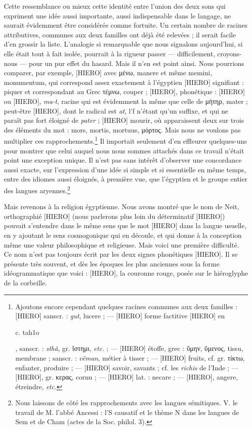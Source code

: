 \documentclass[a4paper, 11pt, oneside]{article}
\begin{document}
Cette ressemblance ou mieux cette identité entre l'union des deux sons qui expriment une idée aussi importante, aussi indispensable dans le langage, ne saurait évidemment être considérée comme fortuite. Un certain nombre de racines attributives, communes aux deux familles ont déjà été relevées ; il serait facile d'en grossir la liste. L'analogie si remarquable que nous signalons aujourd'hui, si elle était tout à fait isolée, pourrait à la rigueur passer --- difficilement, croyons-nous --- pour un pur effet du hasard. Mais il n'en est point ainsi. Nous pourrions comparer, par exemple, [HIERO] avec μένω, manere et même memini, monumentum, qui correspond assez exactement à l'égyptien [HIERO] signifiant : piquer et correspondant au Grec τέμνω, couper ; [HIERO], phonétique : [HIERO] ou [HIERO], \emph{ma-t}, racine qui est évidemment la même que celle de μήτηρ, mater ; peut-être [HIERO], dont le radical est \emph{at}, l'f n'étant qu'un suffixe, et qui ne paraît pas fort éloigné de \emph{pater} ; [HIERO] mourir, où apparaissent deux sur trois des éléments du mot : mors, mortis, mortuus, μόρτος. Mais nous ne voulons pas multiplier ces rapprochements.\footnote{Ajoutons encore cependant quelques racines communes aux deux familles : [HIERO] sanscr. : \emph{gut}, lucere ; --- [HIERO] forme factitive [HIERO] en \begin{coptic}c. tah1o\end{coptic}, sanscr. : \emph{sthâ}, gr. ἴστημι, \emph{etc.} ; --- [HIERO] étoffe, grec : ὕμην, ὕμενος, tissu, membrane ; sanscr. : \emph{vêman}, métier à tisser ; --- [HIERO] fruits, cf. gr. τίκτω, enfanter, produire ; --- [HIERO] savoir, savants ; cf. les \emph{richis} de l'Inde ; --- [HIERO], gr. κερας, cornu ; --- [HIERO] lat. : necare ; --- [HIERO], angere, étreindre, \emph{etc.}} Il importait seulement d'en effleurer quelques-uns pour montrer que celui auquel nous nous sommes attachés dans ce travail n'était point une exception unique. Il n'est pas sans intérêt d'observer une concordance aussi exacte, sur l'expression d'une idée si simple et si essentielle en même temps, entre des idiomes aussi éloignés, à première vue, que l'égyptien et le groupe entier des langues aryennes.\footnote{Nous laissons de côté les rapprochements avec les langues sémitiques. V. le travail de M. l'abbé Ancessi : l'S causatif et le thème N dans les langues de Sem et de Cham (actes de la Soc. philol. 3).}

Mais revenons à la religion égyptienne. Nous avons montré que le nom de Neit, orthographié [HIERO] (nous parlerons plus loin du déterminatif [HIERO]) pouvait s'entendre dans le même sens que le mot [HIERO] dans la langue usuelle, en y ajoutant le sens cosmogonique qui en découle, et qui donne à la conception même une valeur philosophique et religieuse. Mais voici une première difficulté. Ce nom n'est pas toujours écrit par les deux signes phonétiques [HIERO]. Il se présente très souvent, et dès les époques les plus anciennes sous la forme idéogrammatique que voici : [HIERO], la couronne rouge, posée sur le hiéroglyphe de la corbeille.
\end{document}
